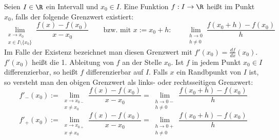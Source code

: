 Seien $I \in \R$ ein Intervall und $x_0 \in I$. Eine Funktion $f: I \to \R$ heißt  im Punkt $x_0$, falls der folgende Grenzwert existiert:
$$\lim_{\substack{x \to x_0 \\ x \in I \setminus \{x_0\}}} \frac{f(x)-f(x_0)}{x-x_0} \qquad \text{bzw. mit $x := x_0 + h$:} \qquad \lim_{\substack{h \to 0 \\ h \neq 0}} \frac{f(x_0 + h) - f(x_0)}{h}$$
Im Falle der Existenz bezeichnet man diesen Grenzwert mit $f'(x_0) = \frac{df}{dx}(x_0)$. $f'(x_0)$ heißt die 1. Ableitung von $f$ an der Stelle $x_0$. Ist $f$ in  jedem Punkt $x_0 \in I$ differenzierbar, so heißt $f$ differenzierbar auf $I$. Falls $x$ ein Randbpunkt von $I$ ist, so versteht man den obigen Grenzwert als links- oder rechtsseitigen Grenzwert:
$$f'_-(x_0) := \lim_{\substack{x \to x_{0-} \\ x \neq x_0}} \frac{f(x)-f(x_0)}{x-x_0} = \lim_{\substack{h \to 0- \\ h \neq 0}} \frac{f(x_0+h)-f(x_0)}{h}$$
$$f'_+(x_0) := \lim_{\substack{x \to x_{0+} \\ x \neq x_0}} \frac{f(x)-f(x_0)}{x-x_0} = \lim_{\substack{h \to 0+ \\ h \neq 0}} \frac{f(x_0+h)-f(x_0)}{h}$$